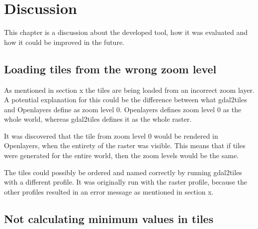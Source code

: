 \chapter{Discussion}\label{CDiscussion}

This chapter is a discussion about the developed tool, how it was evaluated and how it could be improved in the future.

\section{Loading tiles from the wrong zoom level}\label{WhyWrongLevel}

As mentioned in section x the tiles are being loaded from an incorrect zoom layer. A potential explanation for this could be the difference between what gdal2tiles and Openlayers define as zoom level 0. Openlayers defines zoom level 0 as the whole world, whereas gdal2tiles defines it as the whole raster. 

It was discovered that the tile from zoom level 0 would be rendered in Openlayers, when the entirety of the raster was visible. This means that if tiles were generated for the entire world, then the zoom levels would be the same. 

The tiles could possibly be ordered and named correctly by running gdal2tiles with a different profile.  It was originally run with the raster profile, because the other profiles resulted in an error message as mentioned in section x. 

\section{Not calculating minimum values in tiles} \label{WhyNoMin}

